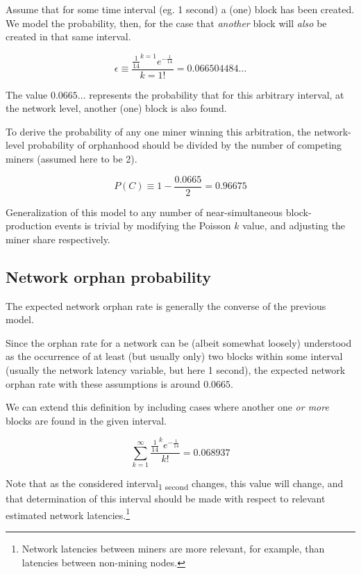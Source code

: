 \documentclass[11pt]{article}
\theoremstyle{plain}
\begin{document}
{Assume that for some time interval (eg. 1 second) a (one) block has been created.
We model the probability, then, for the case that \emph{another} block
will \emph{also} be created in that same interval.

\begin{equation}
    \epsilon \equiv \frac{\frac{1}{14}^{k=1}e^{-\frac{1}{14}}}{k=1!} = 0.066504484...
\end{equation}

The value $0.0665...$ represents the probability that for this arbitrary interval,
at the network level, another (one) block is also found.

To derive the probability of any one miner winning this arbitration,
the network-level probability of orphanhood should be divided by the number
of competing miners (assumed here to be 2).

\begin{equation}
    P(C) \equiv 1 - \frac{0.0665}{2} = 0.96675
\end{equation}

Generalization of this model to any number of near-simultaneous block-production events
is trivial by modifying the Poisson $k$ value, and adjusting the miner share respectively.

\subsection{\normalsize{Network orphan probability}}

The expected network orphan rate is generally the converse of the previous model.

Since the orphan rate for a network can be (albeit somewhat loosely)
understood as the occurrence of at least (but usually only) two blocks
within some interval (usually the network latency variable, but here 1 second),
the expected network orphan rate with these assumptions is around $0.0665$.

We can extend this definition by including cases where another one \emph{or more} blocks
are found in the given interval.

\begin{equation}
    \sum_{k=1}^{\infty}\frac{\frac{1}{14}^{k}e^{-\frac{1}{14}}}{k!} = 0.068937
\end{equation}

Note that as the considered interval\textsubscript{1 second} changes, this value will change,
and that determination of this interval should be made
with respect to relevant estimated network latencies.\footnote{
Network latencies between miners are more relevant, for example,
than latencies between non-mining nodes.
}

}
\end{document}
